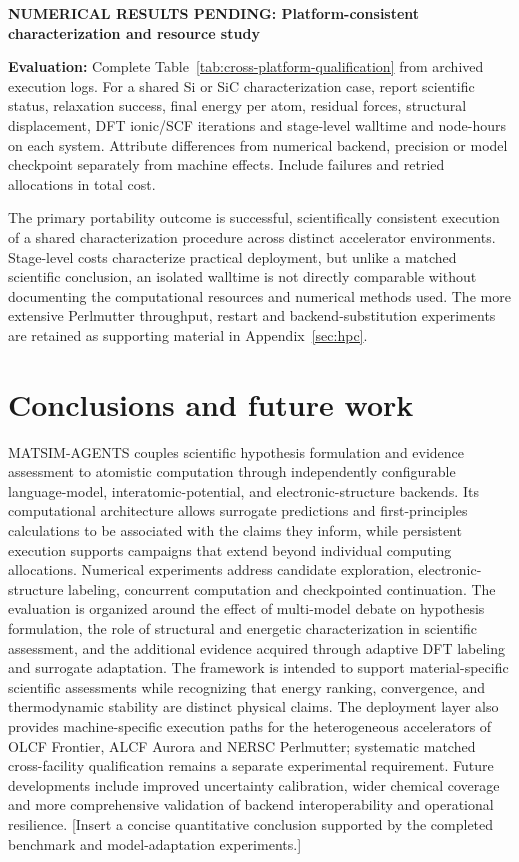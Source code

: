 \documentclass[11pt,a4paper]{article}
\newcommand{\newexperiment}[2]{\par\medskip\noindent\begingroup\color{red!80!black}\textbf{NUMERICAL RESULTS PENDING: #1}\par\noindent\textbf{Evaluation:} #2\par\endgroup\medskip}
\begin{document}
\newexperiment{Platform-consistent characterization and resource study}{Complete Table~\ref{tab:cross-platform-qualification} from archived execution logs. For a shared Si or SiC characterization case, report scientific status, relaxation success, final energy per atom, residual forces, structural displacement, DFT ionic/SCF iterations and stage-level walltime and node-hours on each system. Attribute differences from numerical backend, precision or model checkpoint separately from machine effects. Include failures and retried allocations in total cost.}

The primary portability outcome is successful, scientifically consistent execution of a shared characterization procedure across distinct accelerator environments. Stage-level costs characterize practical deployment, but unlike a matched scientific conclusion, an isolated walltime is not directly comparable without documenting the computational resources and numerical methods used. The more extensive Perlmutter throughput, restart and backend-substitution experiments are retained as supporting material in Appendix~\ref{sec:hpc}.

\section{Conclusions and future work}
\label{sec:conclusions}
MATSIM-AGENTS couples scientific hypothesis formulation and evidence assessment to atomistic computation through independently configurable language-model, interatomic-potential, and electronic-structure backends. Its computational architecture allows surrogate predictions and first-principles calculations to be associated with the claims they inform, while persistent execution supports campaigns that extend beyond individual computing allocations. Numerical experiments address candidate exploration, electronic-structure labeling, concurrent computation and checkpointed continuation. The evaluation is organized around the effect of multi-model debate on hypothesis formulation, the role of structural and energetic characterization in scientific assessment, and the additional evidence acquired through adaptive DFT labeling and surrogate adaptation. The framework is intended to support material-specific scientific assessments while recognizing that energy ranking, convergence, and thermodynamic stability are distinct physical claims. The deployment layer also provides machine-specific execution paths for the heterogeneous accelerators of OLCF Frontier, ALCF Aurora and NERSC Perlmutter; systematic matched cross-facility qualification remains a separate experimental requirement. Future developments include improved uncertainty calibration, wider chemical coverage and more comprehensive validation of backend interoperability and operational resilience. \textcolor{red!80!black}{[Insert a concise quantitative conclusion supported by the completed benchmark and model-adaptation experiments.]}
\end{document}
